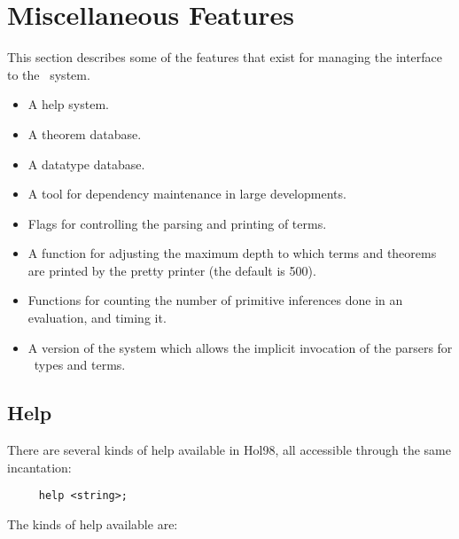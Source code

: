 \chapter{Miscellaneous Features}\label{avramisc}

This section describes some of the features
that exist for managing the interface to the \HOL\ system.

\begin{itemize}
\item A help system.
\item A theorem database.
\item A datatype database.
\item A tool for dependency maintenance in large developments.
\item Flags for controlling the parsing and printing of terms.
\item A function for adjusting the maximum depth to which terms and
theorems are printed by the pretty printer (the default is 500).
\item Functions for counting the number of primitive inferences done in
an evaluation, and timing it.
\item A version of the system which allows the implicit invocation of
the parsers for \HOL\ types and terms.
\end{itemize}

\section{Help}

 There are several kinds of help available in Hol98, all accessible
 through the same incantation:
 \begin{verbatim}
     help <string>;
 \end{verbatim}

 The kinds of help available are:

